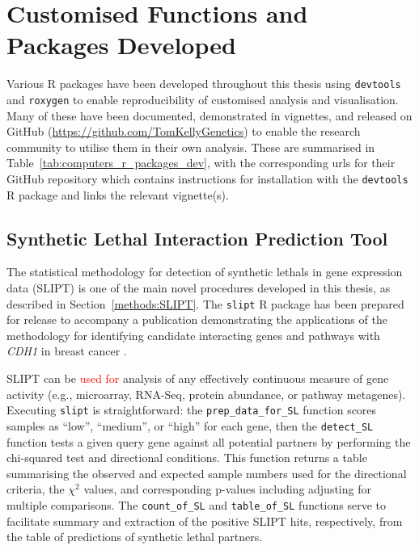 \fi	

\FloatBarrier

\section{Customised Functions and Packages Developed} \label{methods:r_packages}

Various R packages \citep{R_core} have been developed throughout this thesis using \texttt{devtools} \citep{devtools} and \texttt{roxygen} \citep{roxygen} to enable reproducibility of customised analysis and visualisation. Many of these have been documented, demonstrated in vignettes, and released on GitHub (\url{https://github.com/TomKellyGenetics})
to enable the research community to utilise them in their own analysis.
These are summarised in Table~\ref{tab:computers_r_packages_dev}, with the corresponding urls for their GitHub repository which contains instructions for installation with the \texttt{devtools} R package \citep{devtools} and links the relevant vignette(s).

\subsection{Synthetic Lethal Interaction Prediction Tool}
The statistical methodology for detection of \glspl{synthetic lethal} in \gls{gene expression} data (\gls{SLIPT}) is one of the main novel procedures developed in this thesis, as described in Section~\ref{methods:SLIPT}. The \texttt{slipt} R package has been prepared for release %
to accompany a publication demonstrating the applications of the methodology for identifying candidate interacting genes and pathways with \textit{CDH1} in breast cancer \citep{TCGA2012}.

\gls{SLIPT} can be \textcolor{red}{used for} analysis of any effectively continuous measure of gene activity (e.g., \gls{microarray}, \gls{RNA-Seq}, protein abundance, or pathway \glspl{metagene}). Executing \texttt{slipt} is straightforward: the \texttt{prep\_data\_for\_SL} function scores samples as ``low'', ``medium'', or ``high'' for each gene, then the \texttt{detect\_SL} function tests a given query gene against all potential partners by performing the chi-squared test and directional conditions. This function returns a table summarising the observed and expected sample numbers used for the directional criteria, the $\chi^2$ values, and corresponding p-values including adjusting for multiple comparisons. The \texttt{count\_of\_SL} and \texttt{table\_of\_SL} functions serve to facilitate summary and extraction of the positive \gls{SLIPT} hits, respectively, from the table of predictions of \gls{synthetic lethal} partners.

